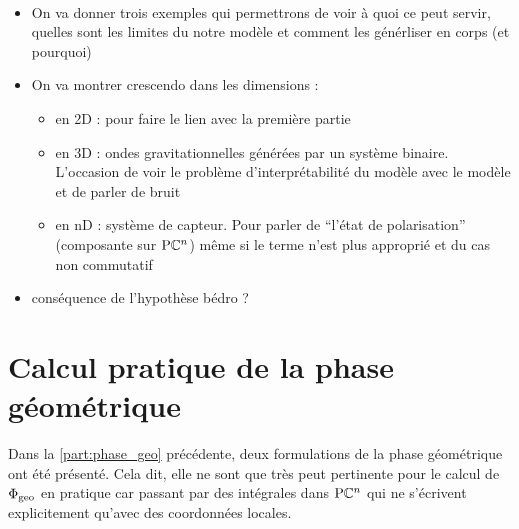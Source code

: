 
\\
\begin{itemize}
	\item On va donner trois exemples qui permettrons de voir à quoi ce peut servir, quelles sont les limites du notre modèle et comment les générliser en corps (et pourquoi)
	
	\item On va montrer crescendo dans les dimensions :\begin{itemize}
		
		\item en 2D  : pour faire le lien avec la première partie
		
		\item en 3D : ondes gravitationnelles générées par un système binaire. L'occasion de voir le problème d'interprétabilité du modèle avec le modèle et de parler de bruit
		
		\item en nD : système de capteur. Pour parler de ``l'état de polarisation'' (composante sur $\text{\normalfont P}\mathbb{C}^{n}$) même si le terme n'est plus approprié et du cas non commutatif
	\end{itemize}
	
	\item conséquence de l'hypothèse bédro ?
\end{itemize}




\section{\wip Calcul pratique de la phase géométrique}

Dans la \cref{part:phase_geo} précédente, deux formulations de la phase géométrique ont été présenté. Cela dit, elle ne sont que très peut pertinente pour le calcul de $\Phi_{\text{\normalfont geo}}$ en pratique car passant par des intégrales dans $\text{\normalfont P}\mathbb{C}^{n}$ qui ne s'écrivent explicitement qu'avec des coordonnées locales.
\\

